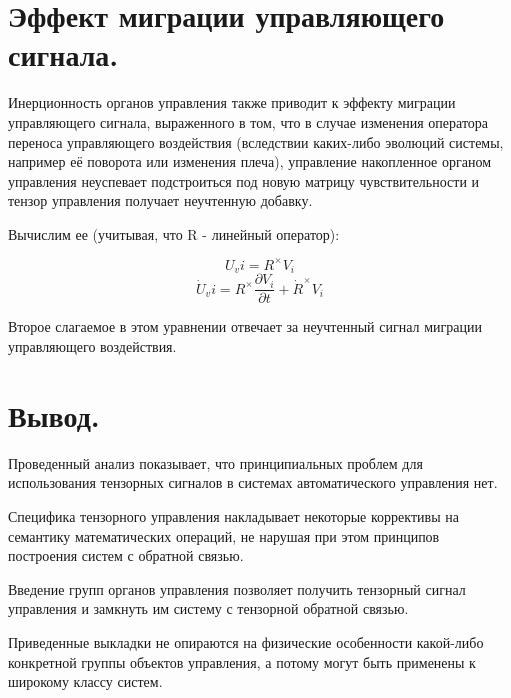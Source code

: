 \documentclass[a4paper]{article}
\begin{document}
\section{Эффект миграции управляющего сигнала.}
Инерционность органов управления также приводит к эффекту миграции управляющего сигнала, выраженного в том, что в случае изменения оператора переноса управляющего воздействия (вследствии каких-либо эволюций системы, например её поворота или изменения плеча), управление накопленное органом управления неуспевает подстроиться под новую матрицу чувствительности и тензор управления получает неучтенную добавку.

Вычислим ее (учитывая, что R - линейный оператор):

\begin{equation}U_vi = R^\times V_i\end{equation}
\begin{equation}\dot{U}_vi = R^\times \frac{\partial{V_i}}{\partial{t}} + \dot{R}^\times V_i\end{equation}

Второе слагаемое в этом уравнении отвечает за неучтенный сигнал миграции управляющего воздействия.  

\section{Вывод.}
Проведенный анализ показывает, что принципиальных проблем для использования тензорных сигналов в системах автоматического управления нет. 

Специфика тензорного управления накладывает некоторые коррективы на семантику математических операций, не нарушая при этом принципов построения систем с обратной связью.

Введение групп органов управления позволяет получить тензорный сигнал управления и замкнуть им систему с тензорной обратной связью. 

Приведенные выкладки не опираются на физические особенности какой-либо конкретной группы объектов управления, а потому могут быть применены к широкому классу систем.
\end{document}

